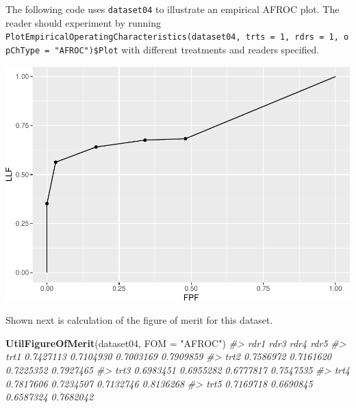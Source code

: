 \documentclass[
]{book}
\newenvironment{Shaded}{\begin{snugshade}}{\end{snugshade}}
\newcommand{\CommentTok}[1]{\textcolor[rgb]{0.56,0.35,0.01}{\textit{#1}}}
\newcommand{\DataTypeTok}[1]{\textcolor[rgb]{0.13,0.29,0.53}{#1}}
\newcommand{\DecValTok}[1]{\textcolor[rgb]{0.00,0.00,0.81}{#1}}
\newcommand{\KeywordTok}[1]{\textcolor[rgb]{0.13,0.29,0.53}{\textbf{#1}}}
\newcommand{\NormalTok}[1]{#1}
\newcommand{\OperatorTok}[1]{\textcolor[rgb]{0.81,0.36,0.00}{\textbf{#1}}}
\newcommand{\StringTok}[1]{\textcolor[rgb]{0.31,0.60,0.02}{#1}}
\begin{document}
The following code uses \texttt{dataset04} to illustrate an empirical AFROC plot. The reader should experiment by running \texttt{PlotEmpiricalOperatingCharacteristics(dataset04,\ trts\ =\ 1,\ rdrs\ =\ 1,\ opChType\ =\ "AFROC")\$Plot} with different treatments and readers specified.

\begin{Shaded}
\end{Shaded}

\includegraphics{03-empirical_files/figure-latex/unnamed-chunk-7-1.pdf}

Shown next is calculation of the figure of merit for this dataset.

\begin{Shaded}
\begin{Highlighting}[]
\KeywordTok{UtilFigureOfMerit}\NormalTok{(dataset04, }\DataTypeTok{FOM =} \StringTok{"AFROC"}\NormalTok{)}
\CommentTok{#>           rdr1      rdr3      rdr4      rdr5}
\CommentTok{#> trt1 0.7427113 0.7104930 0.7003169 0.7909859}
\CommentTok{#> trt2 0.7586972 0.7161620 0.7225352 0.7927465}
\CommentTok{#> trt3 0.6983451 0.6955282 0.6777817 0.7547535}
\CommentTok{#> trt4 0.7817606 0.7234507 0.7132746 0.8136268}
\CommentTok{#> trt5 0.7169718 0.6690845 0.6587324 0.7682042}
\end{Highlighting}
\end{Shaded}
\end{document}
